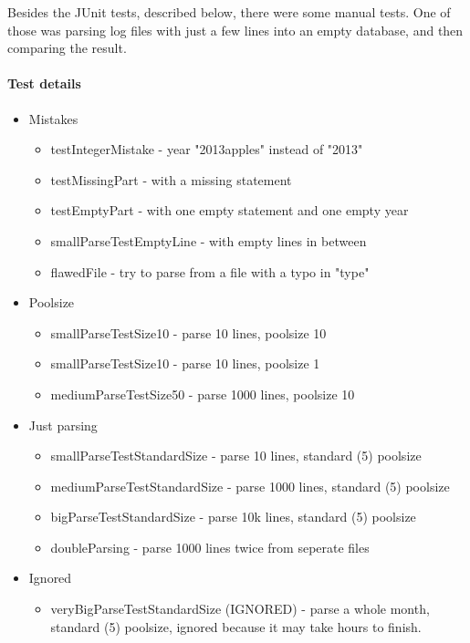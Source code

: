 Besides the JUnit tests, described below, there were some manual tests. One of those was parsing log files with
just a few lines into an empty database, and then comparing the result.

\paragraph{Test details}
\begin{itemize}
 
\item Mistakes 
\begin{itemize}
\item testIntegerMistake - year "2013apples" instead of "2013"
\item testMissingPart - with a missing statement
\item testEmptyPart - with one empty statement and one empty year
\item smallParseTestEmptyLine - with empty lines in between
\item flawedFile - try to parse from a file with a typo in "type" %
\end{itemize}

\item Poolsize
\begin{itemize}
\item smallParseTestSize10 - parse 10 lines, poolsize 10
\item smallParseTestSize10 - parse 10 lines, poolsize 1
\item mediumParseTestSize50 - parse 1000 lines, poolsize 10
\end{itemize}

\item Just parsing
\begin{itemize}
\item smallParseTestStandardSize - parse 10 lines, standard (5) poolsize
\item mediumParseTestStandardSize - parse 1000 lines, standard (5) poolsize
\item bigParseTestStandardSize - parse 10k lines, standard (5) poolsize
\item doubleParsing - parse 1000 lines twice from seperate files
\end{itemize}

\item Ignored
\begin{itemize}
\item veryBigParseTestStandardSize (IGNORED) - parse a whole month, standard (5) poolsize, ignored because it may take hours 
to finish.
\end{itemize}

\end{itemize}
